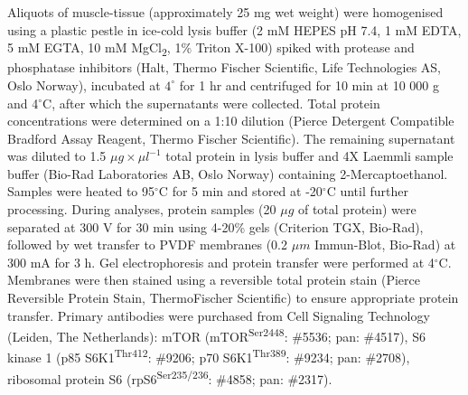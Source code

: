 \documentclass[twoside,10pt]{gihclass} %
\begin{document}
Aliquots of muscle-tissue (approximately 25 mg wet weight) were homogenised using a plastic pestle in ice-cold lysis buffer (2 mM HEPES pH 7.4, 1 mM EDTA, 5 mM EGTA, 10 mM MgCl\textsubscript{2}, 1\(\%\) Triton X-100) spiked with protease and phosphatase inhibitors (Halt, Thermo Fischer Scientific, Life Technologies AS, Oslo Norway), incubated at \(4^{\circ}\) for 1 hr and centrifuged for 10 min at 10 000 g and 4\(^{\circ}\)C, after which the supernatants were collected.
Total protein concentrations were determined on a 1:10 dilution (Pierce Detergent Compatible Bradford Assay Reagent, Thermo Fischer Scientific). The remaining supernatant was diluted to 1.5 \(\mu g \times \mu l^{-1}\) total protein in lysis buffer and 4X Laemmli sample buffer (Bio-Rad Laboratories AB, Oslo Norway) containing 2-Mercaptoethanol.
Samples were heated to 95\(^{\circ}\)C for 5 min and stored at -20\(^{\circ}\)C until further processing.
During analyses, protein samples (20 \(\mu g\) of total protein) were separated at 300 V for 30 min using 4-20\% gels (Criterion TGX, Bio-Rad), followed by wet transfer to PVDF membranes (0.2 \(\mu m\) Immun-Blot, Bio-Rad) at 300 mA for 3 h.
Gel electrophoresis and protein transfer were performed at 4\(^{\circ}\)C.
Membranes were then stained using a reversible total protein stain (Pierce Reversible Protein Stain, ThermoFischer Scientific) to ensure appropriate protein transfer.
Primary antibodies were purchased from Cell Signaling Technology (Leiden, The Netherlands): mTOR (mTOR\textsuperscript{Ser2448}: \#5536; pan: \#4517), S6 kinase 1 (p85 S6K1\textsuperscript{Thr412}: \#9206; p70 S6K1\textsuperscript{Thr389}: \#9234; pan: \#2708), ribosomal protein S6 (rpS6\textsuperscript{Ser235/236}: \#4858; pan: \#2317).
\end{document}
